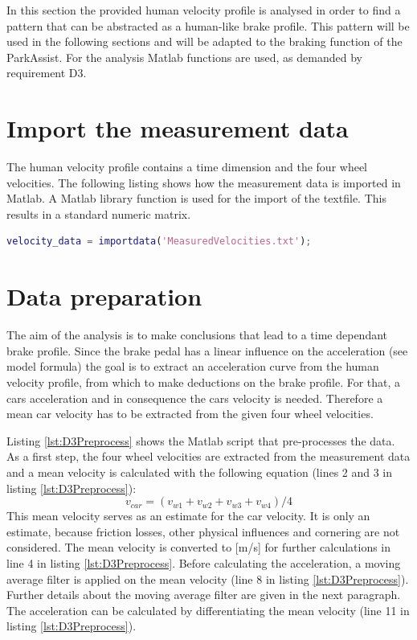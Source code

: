 In this section the provided human velocity profile is analysed in order to find a pattern that can be abstracted as a human-like brake profile.
This pattern will be used in the following sections and will be adapted to the braking function of the ParkAssist.
For the analysis Matlab functions are used, as demanded by requirement D3.
\section{Import the measurement data}
The human velocity profile contains a time dimension and the four wheel velocities.
The following listing shows how the measurement data is imported in Matlab.
A Matlab library function is used for the import of the textfile.
This results in a standard numeric matrix.

\begin{lstlisting}[language=Matlab,basicstyle=\scriptsize	,caption= Import measurement data in Matlab,label= lst:D3Import]
%import velocity data
velocity_data = importdata('MeasuredVelocities.txt');
\end{lstlisting}

\section{Data preparation}
The aim of the analysis is to make conclusions that lead to a time dependant brake profile.
Since the brake pedal has a linear influence on the acceleration (see model formula) the goal is to extract an acceleration curve from the human velocity profile, from which to make deductions on the brake profile.
For that, a cars acceleration and in consequence the cars velocity is needed.
Therefore a mean car velocity has to be extracted from the given four wheel velocities.

Listing \ref{lst:D3Preprocess} shows the Matlab script that pre-processes the data.
As a first step, the four wheel velocities are extracted from the measurement data and a mean velocity is calculated with the following equation (lines 2 and 3 in listing \ref{lst:D3Preprocess}):
\begin{equation}
	v_{car} = (v_{w1} +v_{w2} + v_{w3} +v_{w4})/4
\end{equation}
This mean velocity serves as an estimate for the car velocity.
It is only an estimate, because friction losses, other physical influences and cornering are not considered.
The mean velocity is converted to [m/s] for further calculations in line 4 in listing \ref{lst:D3Preprocess}.
Before calculating the acceleration, a moving average filter is applied on the mean velocity (line 8 in listing \ref{lst:D3Preprocess}). Further details about the moving average filter are given in the next paragraph.
The acceleration can be calculated by differentiating the mean velocity (line 11 in listing \ref{lst:D3Preprocess}).

